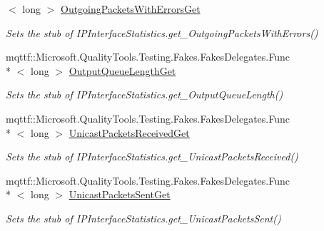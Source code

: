 \begin{DoxyCompactItemize}
$<$ long $>$ \hyperlink{class_system_1_1_net_1_1_network_information_1_1_fakes_1_1_stub_i_p_interface_statistics_a0da4fab99c659892b028904e9bf4bcb6}{Outgoing\-Packets\-With\-Errors\-Get}
\begin{DoxyCompactList}\small\item\em Sets the stub of I\-P\-Interface\-Statistics.\-get\-\_\-\-Outgoing\-Packets\-With\-Errors()\end{DoxyCompactList}\item 
mqttf\-::\-Microsoft.\-Quality\-Tools.\-Testing.\-Fakes.\-Fakes\-Delegates.\-Func\\*
$<$ long $>$ \hyperlink{class_system_1_1_net_1_1_network_information_1_1_fakes_1_1_stub_i_p_interface_statistics_a610393a3c6d5f4b1b70aa50c473fc0f8}{Output\-Queue\-Length\-Get}
\begin{DoxyCompactList}\small\item\em Sets the stub of I\-P\-Interface\-Statistics.\-get\-\_\-\-Output\-Queue\-Length()\end{DoxyCompactList}\item 
mqttf\-::\-Microsoft.\-Quality\-Tools.\-Testing.\-Fakes.\-Fakes\-Delegates.\-Func\\*
$<$ long $>$ \hyperlink{class_system_1_1_net_1_1_network_information_1_1_fakes_1_1_stub_i_p_interface_statistics_a6ddd27f6bbccb24102084e085a1533ab}{Unicast\-Packets\-Received\-Get}
\begin{DoxyCompactList}\small\item\em Sets the stub of I\-P\-Interface\-Statistics.\-get\-\_\-\-Unicast\-Packets\-Received()\end{DoxyCompactList}\item 
mqttf\-::\-Microsoft.\-Quality\-Tools.\-Testing.\-Fakes.\-Fakes\-Delegates.\-Func\\*
$<$ long $>$ \hyperlink{class_system_1_1_net_1_1_network_information_1_1_fakes_1_1_stub_i_p_interface_statistics_a11773f4540f065bce15428347c633487}{Unicast\-Packets\-Sent\-Get}
\begin{DoxyCompactList}\small\item\em Sets the stub of I\-P\-Interface\-Statistics.\-get\-\_\-\-Unicast\-Packets\-Sent()\end{DoxyCompactList}\end{DoxyCompactItemize}
